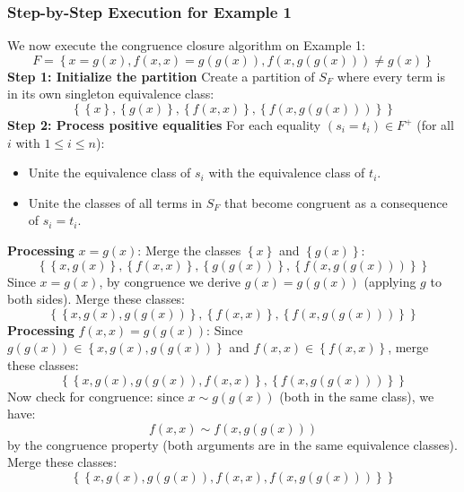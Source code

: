 \documentclass[a4paper]{article}
\theoremstyle{definition}
\begin{document}
\subsubsection{Step-by-Step Execution for Example 1}
We now execute the congruence closure algorithm on Example 1:
\[
	F = \left\{ x = g(x), f(x,x) = g(g(x)), f(x,g(g(x))) \neq g(x) \right\}
\]
\textbf{Step 1: Initialize the partition}
\vspace{1em}
\noindent
\newline
Create a partition of \( S_F \) where every term is in its own singleton equivalence class:
\[
  \left\{ \left\{ x \right\}, \left\{g(x) \right\}, \left\{f(x,x) \right\}, \left\{f(x,g(g(x))) \right\} \right\}
\]
\textbf{Step 2: Process positive equalities}
\vspace{1em}
\noindent
\newline
For each equality \( (s_i = t_i) \in F^+ \) (for all \( i \) with \( 1 \leq i \leq n \)):
\begin{itemize}
	\item Unite the equivalence class of \( s_i \) with the equivalence class of \( t_i \).
	\item Unite the classes of all terms in \( S_F \) that become congruent as a consequence of \( s_i = t_i \).
\end{itemize}
\textbf{Processing} \( x = g(x) \):
\vspace{1em}
\noindent
\newline
Merge the classes \( \left\{x\right\} \) and \( \left\{g(x)\right\} \):
\[
  \left\{ \left\{ x,g(x) \right\}, \left\{f(x,x) \right\}, \left\{g(g(x)) \right\}, \left\{f(x,g(g(x))) \right\} \right\}
\]
Since \( x = g(x) \), by congruence we derive \( g(x) = g(g(x)) \) (applying \( g \) to both sides). Merge these classes:
\[
	\left\{ \left\{x,g(x),g(g(x)) \right\}, \left\{f(x,x) \right\}, \left\{f(x,g(g(x))) \right\} \right\}
\]
\textbf{Processing} \( f(x,x) = g(g(x)) \):
\vspace{1em}
\noindent
\newline
Since \( g(g(x)) \in \left\{x,g(x),g(g(x)) \right\} \) and \( f(x,x) \in \left\{f(x,x) \right\} \), merge these classes:
\[
  \left\{ \left\{ x,g(x),g(g(x)),f(x,x) \right\}, \left\{ f(x,g(g(x))) \right\} \right\}
\]
Now check for congruence: since \( x \sim g(g(x)) \) (both in the same class), we have:
\[
  f(x,x) \sim f(x,g(g(x)))
\]
by the congruence property (both arguments are in the same equivalence classes). Merge these classes:
\[
	\left\{ \left\{ x,g(x),g(g(x)),f(x,x),f(x,g(g(x))) \right\} \right\}
\]
\end{document}
